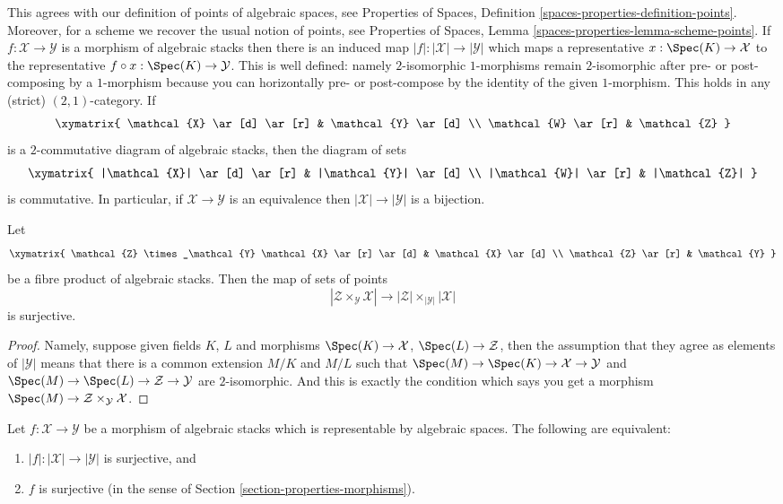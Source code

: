 \noindent
This agrees with our definition of points of algebraic spaces, see
Properties of Spaces, Definition \ref{spaces-properties-definition-points}.
Moreover, for a scheme we recover the usual notion of points, see
Properties of Spaces, Lemma \ref{spaces-properties-lemma-scheme-points}.
If $f : \mathcal{X} \to \mathcal{Y}$ is a morphism of algebraic stacks
then there is an induced map $|f| : |\mathcal{X}| \to |\mathcal{Y}|$ which
maps a representative $x : \Spec(K) \to \mathcal{X}$ to the
representative $f \circ x : \Spec(K) \to \mathcal{Y}$. This is
well defined: namely $2$-isomorphic $1$-morphisms remain $2$-isomorphic after
pre- or post-composing by a $1$-morphism because you can horizontally
pre- or post-compose by the identity of the given $1$-morphism. This holds
in any (strict) $(2, 1)$-category. If
$$
\xymatrix{
\mathcal{X} \ar[d] \ar[r] & \mathcal{Y} \ar[d] \\
\mathcal{W} \ar[r] & \mathcal{Z}
}
$$
is a $2$-commutative diagram of algebraic stacks, then the diagram
of sets
$$
\xymatrix{
|\mathcal{X}| \ar[d] \ar[r] & |\mathcal{Y}| \ar[d] \\
|\mathcal{W}| \ar[r] & |\mathcal{Z}|
}
$$
is commutative.
In particular, if $\mathcal{X} \to \mathcal{Y}$ is an equivalence
then $|\mathcal{X}| \to |\mathcal{Y}|$ is a bijection.

\begin{lemma}
\label{lemma-points-cartesian}
Let
$$
\xymatrix{
\mathcal{Z} \times_\mathcal{Y} \mathcal{X} \ar[r] \ar[d] &
\mathcal{X} \ar[d] \\
\mathcal{Z} \ar[r] & \mathcal{Y}
}
$$
be a fibre product of algebraic stacks. Then the map of sets
of points
$$
|\mathcal{Z} \times_\mathcal{Y} \mathcal{X}|
\longrightarrow
|\mathcal{Z}| \times_{|\mathcal{Y}|} |\mathcal{X}|
$$
is surjective.
\end{lemma}

\begin{proof}
Namely, suppose given fields $K$, $L$ and morphisms
$\Spec(K) \to \mathcal{X}$, $\Spec(L) \to \mathcal{Z}$,
then the assumption that they agree as elements of $|\mathcal{Y}|$ means that
there is a common extension $M/K$ and $M/L$
such that
$\Spec(M) \to \Spec(K) \to \mathcal{X} \to \mathcal{Y}$ and
$\Spec(M) \to \Spec(L) \to \mathcal{Z} \to \mathcal{Y}$
are $2$-isomorphic. And this is exactly the condition which says you get a
morphism $\Spec(M) \to \mathcal{Z} \times_\mathcal{Y} \mathcal{X}$.
\end{proof}

\begin{lemma}
\label{lemma-characterize-surjective}
Let $f : \mathcal{X} \to \mathcal{Y}$ be a morphism of algebraic stacks
which is representable by algebraic spaces. The following are equivalent:
\begin{enumerate}
\item $|f| : |\mathcal{X}| \to |\mathcal{Y}|$ is surjective, and
\item $f$ is surjective
(in the sense of Section \ref{section-properties-morphisms}).
\end{enumerate}
\end{lemma}

